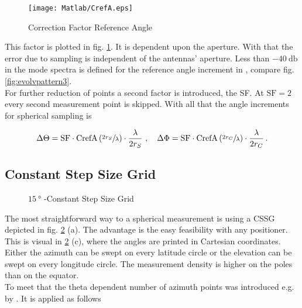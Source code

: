 \begin{figure}
\centering
\texttt{[image: Matlab/CrefA.eps]}
\caption{Correction Factor Reference Angle}
\label{fig:crefa}
\end{figure}

This factor is plotted in fig. \ref{fig:crefa}. It is dependent upon the aperture. With that the error due to sampling is independent of the antennas' aperture. Less than $\SI{-40}{\decibel}$ in the mode spectra is defined for the reference angle increment in \cite{2018arXiv180310993F}, compare fig. \ref{fig:evolvpattern3}.\\
For further reduction of points a second factor is introduced, the \acf{SF}. At $\text{SF}=2$ every second measurement point is skipped. With all that the angle increments for spherical sampling is

\begin{equation}
\Delta\Theta = \text{SF}\cdot\text{CrefA}\left(\sfrac{2r_S}{\lambda}\right)\cdot\frac{\lambda}{2r_S}\ ,\quad\Delta\Phi = \text{SF}\cdot\text{CrefA}\left(\sfrac{2r_C}{\lambda}\right)\cdot\frac{\lambda}{2r_C}\,.
\label{eq:angle}
\end{equation}

\subsection{Constant Step Size Grid}


\begin{figure}[h]
  \centering
  \centering
  \centering
  \centering
\caption{$\SI{15}{\degree}$ -Constant Step Size Grid}
\label{fig:cssg}
\end{figure}

The most straightforward way to a spherical measurement is using a \ac{CSSG} depicted in fig. \ref{fig:cssg} (a). The advantage is the easy feasibility with any positioner. This is visual in \ref{fig:cssg} (c), where the angles are printed in Cartesian coordinates. Either the azimuth can be swept on every latitude circle or the elevation can be swept on every longitude circle. The measurement density is higher on the poles than on the equator.\\
To meet that the theta dependent number of azimuth points was introduced e.g. by \cite{ctiaat}. It is applied as follows

